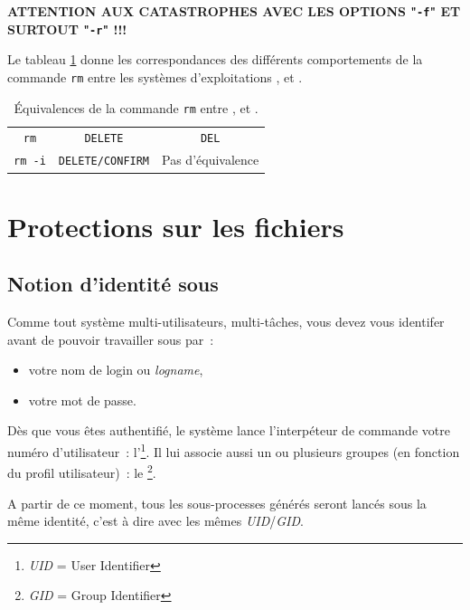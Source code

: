 \begin{center}
{\large
	{\bf
		ATTENTION AUX CATASTROPHES AVEC LES
		OPTIONS "{\tt -f}" ET SURTOUT "{\tt -r}" !!!
	}
}
\end{center}

Le tableau \ref{tab-cmds-equiv-rm} donne les correspondances des
diff{\'e}rents comportements de la commande {\tt rm} entre les syst{\`e}mes
d'exploitations {\Unix}, {\OpenVMS} et {\DOS}.

\begin{table}[hbtp]
\centering
\begin{tabular}{|c|c|c|}
	\hline
		{\Unix}			&	{\OpenVMS}		&	{\DOS}					\\
	\hline \hline
		{\tt rm}		&	{\tt DELETE}	&	{\tt DEL}				\\
		{\tt rm -i}		&	{\tt DELETE/CONFIRM}
											&	Pas d'{\'e}quivalence	\\
	\hline
\end{tabular}
\caption{\label{tab-cmds-equiv-rm}\'{E}quivalences de la commande
{\tt rm} entre {\Unix},{\OpenVMS} et {\DOS}.}
\end{table}

\section{\label{cmds-protect}Protections sur les fichiers}

\subsection{\label{cmds-unix-id}Notion d'identit{\'e} sous {\Unix}}

Comme tout syst{\`e}me multi-utilisateurs, multi-t{\^a}ches, vous devez vous
identifer avant de pouvoir travailler sous {\Unix} par~:
\begin{itemize}
	\item	votre nom de login ou {\sl logname},
	\item	votre mot de passe.
\end{itemize}

D{\`e}s que vous {\^e}tes authentifi{\'e}, le syst{\`e}me lance
l'interp{\'e}teur de commande votre num{\'e}ro d'utilisateur~:
l'\footnote{{\sl UID} = User Identifier}. Il lui
associe aussi un ou plusieurs groupes (en fonction du profil
utilisateur)~: le \footnote{{\sl GID} = Group Identifier}.

A partir de ce moment, tous les sous-processes g{\'e}n{\'e}r{\'e}s seront lanc{\'e}s
sous la m{\^e}me identit{\'e}, c'est {\`a} dire avec les m{\^e}mes {\sl UID}/{\sl GID}.

